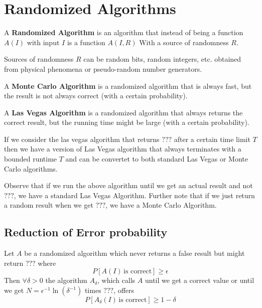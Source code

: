 \section{Randomized Algorithms}

\begin{definition}
	A \textbf{Randomized Algorithm} is an algorithm that instead of being a function $A(I)$ with input $I$ is a function $A(I, R)$ With a source of randomness $R$.
\end{definition}

\begin{remark}
	Sources of randomness $R$ can be random bits, random integers, etc. obtained from physical phenomena or pseudo-random number generators.
\end{remark}

\begin{definition}
	A \textbf{Monte Carlo Algorithm} is a randomized algorithm that is always fast, but the result is not always correct (with a certain probability).
\end{definition}

\begin{definition}
	A \textbf{Las Vegas Algorithm} is a randomized algorithm that always returns the correct result, but the running time might be large (with a certain probability).
\end{definition}


\begin{remark}
	If we consider the las vegas algorithm that returns $???$ after a certain time limit $T$ then we have a version of Las Vegas algorithm that always terminates with a bounded runtime $T$ and can be convertet to both standard Las Vegas or Monte Carlo algorithms.
\end{remark}

\begin{remark}
	Observe that if we run the above algorithm until we get an actual result and not $???$, we have a standard Las Vegas Algorithm. Further note that if we just return a random result when we get $???$, we have a Monte Carlo Algorithm.
\end{remark}

\subsection{Reduction of Error probability}

\begin{theorem}
	Let $A$ be a randomized algorithm which never returns a false result but might return $???$ where
	$$P[A(I) \, \text{is correct}] \geq \epsilon$$
	Then $\forall \delta \gt 0$ the algorithm $A_\delta$, which calls $A$ until we get a correct value or until we get $N = {\epsilon}^{-1} \ln(\delta^{-1})$ times $???$, offers
	$$P[A_\delta(I) \, \text{is correct}] \geq 1 - \delta$$
\end{theorem}

